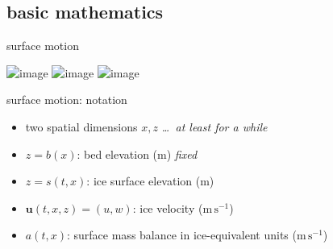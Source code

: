 \documentclass[10pt,dvipsnames]{beamer}
\newcommand{\bu}{\mathbf{u}}
\newcommand{\comm}[1]{{\footnotesize \hfill \emph{#1}}}
\begin{document}
\subsection{basic mathematics}

\begin{frame}{surface motion}

\bigskip
\begin{center}
\includegraphics<1>[width=\textwidth]{noboat}
\includegraphics<2>[width=\textwidth]{boat}
\includegraphics<3>[width=\textwidth]{boatplus}
\end{center}

\end{frame}

\begin{frame}{surface motion: notation}
\begin{center}
\end{center}

\vspace{-3mm}
\begin{itemize}
\item two spatial dimensions $x,z$ \comm{\dots\, at least for a while}
\item $z = b(x)$: bed elevation (m) \comm{fixed}
\item $z = s(t,x)$: ice surface elevation (m)
\item $\bu(t,x,z)=(u,w)$: ice velocity ($\text{m}\,\text{s}^{-1}$)
\item $a(t,x)$: surface mass balance in ice-equivalent units ($\text{m}\,\text{s}^{-1}$)
\end{itemize}
\end{frame}
\end{document}
